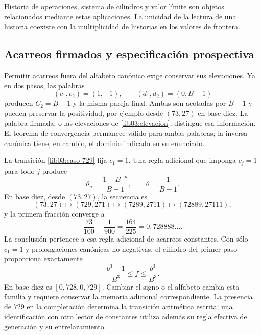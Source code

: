Historia de operaciones, sistema de cilindros y valor límite son
objetos relacionados mediante estas aplicaciones. La unicidad de la
lectura de una historia coexiste con la multiplicidad de historias en
los valores de frontera.

\subsection{Acarreos firmados y especificación prospectiva}
\label{lib03:firmados}

Permitir acarreos fuera del alfabeto canónico exige conservar sus
elevaciones. Ya en dos pasos, las palabras
\[
 (c_1,c_2)=(1,-1),\qquad(d_1,d_2)=(0,B-1)
\]
producen \(C_2=B-1\) y la misma pareja final. Ambas son acotadas por
\(B-1\) y pueden preservar la positividad, por ejemplo desde
\((73,27)\) en base diez. La palabra firmada, o las elevaciones de
\eqref{lib03:elevacion}, distingue esa información. El teorema de
convergencia permanece válido para ambas palabras; la inversa canónica
tiene, en cambio, el dominio indicado en su enunciado.

La transición \eqref{lib03:caso-729} fija \(c_1=1\). Una regla
adicional que imponga \(c_j=1\) para todo \(j\) produce
\begin{equation}
 \theta_n=\frac{1-B^{-n}}{B-1},\qquad
 \theta=\frac1{B-1}.
 \label{lib03:acarreo-constante}
\end{equation}
En base diez, desde \((73,27)\), la secuencia es
\[
 (73,27)\longmapsto(729,271)\longmapsto(7289,2711)
 \longmapsto(72889,27111),
\]
y la primera fracción converge a
\begin{equation}
 \frac{73}{100}-\frac1{900}=\frac{164}{225}
 =0{,}728888\ldots.
 \label{lib03:limite-constante}
\end{equation}
La conclusión pertenece a esa regla adicional de acarreos constantes.
Con sólo \(c_1=1\) y prolongaciones canónicas no negativas, el cilindro
del primer paso proporciona exactamente
\begin{equation}
 \frac{b^3-1}{B^3}\leq f\leq\frac{b^3}{B^3}.
 \label{lib03:primer-cilindro}
\end{equation}
En base diez es \([0{,}728,0{,}729]\). Cambiar el signo o el alfabeto
cambia esta familia y requiere conservar la memoria adicional
correspondiente. La presencia de \(729\) en la completación determina
la transición aritmética escrita; una identificación con otro lector de
constantes utiliza además su regla efectiva de generación y su
entrelazamiento.

